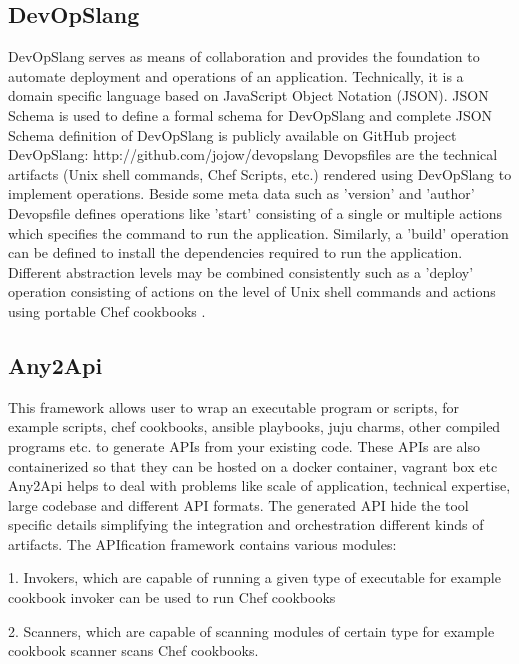\subsection{ DevOpSlang}
     
     DevOpSlang serves as means of collaboration and provides the
     foundation to automate deployment and operations of an
     application. Technically, it is a domain specific language based
     on JavaScript Object Notation (JSON). JSON Schema is used to
     define a formal schema for DevOpSlang and complete JSON Schema
     definition of DevOpSlang is publicly available on GitHub project
     DevOpSlang: http://github.com/jojow/devopslang Devopsfiles are
     the technical artifacts (Unix shell commands, Chef Scripts, etc.)
     rendered using DevOpSlang to implement operations.  Beside some
     meta data such as ’version’ and ’author’ Devopsfile defines
     operations like ’start’ consisting of a single or multiple
     actions which specifies the command to run the
     application. Similarly, a ’build’ operation can be defined to
     install the dependencies required to run the
     application. Different abstraction levels may be combined
     consistently such as a ’deploy’ operation consisting of actions
     on the level of Unix shell commands and actions using portable
     Chef cookbooks \cite{DevOpSlang}.

\subsection{ Any2Api}

     This framework \cite{wettinger-any2api} allows user to wrap an
     executable program or scripts, for example scripts, chef
     cookbooks, ansible playbooks, juju charms, other compiled
     programs etc. to generate APIs from your existing code.  These
     APIs are also containerized so that they can be hosted on a
     docker container, vagrant box etc Any2Api helps to deal with
     problems like scale of application, technical expertise, large
     codebase and different API formats. The generated API hide the
     tool specific details simplifying the integration and
     orchestration different kinds of artifacts. The APIfication
     framework contains various modules:

     1. Invokers, which are capable of running a given type of
        executable for example cookbook invoker can be used to run Chef
        cookbooks

     2. Scanners, which are capable of scanning modules of certain type for
        example cookbook scanner scans Chef cookbooks.

